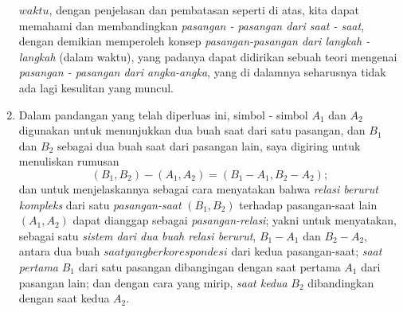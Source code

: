 \documentclass[a4paper, 12pt]{book}
\begin{document}
\begin{enumerate}
$waktu$, dengan penjelasan dan pembatasan seperti di atas, kita dapat memahami
dan membandingkan \textit{pasangan - pasangan dari saat - saat}, dengan 
demikian memperoleh konsep \textit{pasangan-pasangan dari langkah - langkah}
 (dalam waktu), yang padanya dapat didirikan sebuah teori mengenai 
\textit{pasangan - pasangan dari angka-angka}, yang di dalamnya seharusnya 
tidak ada lagi kesulitan yang muncul.  
\item Dalam pandangan yang telah diperluas ini, simbol - simbol $A_1$ dan $A_2$
digunakan untuk menunjukkan dua buah saat dari satu pasangan, dan $B_1$ 
dan $B_2$ sebagai dua buah saat dari pasangan lain, saya digiring untuk 
menuliskan rumusan
\[
(B_1, B_2) - (A_1, A_2) = (B_1 - A_1, B_2 - A_2);
\]
dan untuk menjelaskannya sebagai cara menyatakan bahwa 
\textit{relasi berurut kompleks} dari satu \textit{pasangan-saat} $(B_1, B_2)$
terhadap pasangan-saat lain $(A_1, A_2)$ dapat dianggap sebagai 
\textit{pasangan-relasi}; yakni untuk menyatakan, sebagai satu 
\textit{sistem dari dua buah relasi berurut}, $B_1 - A_1$ dan $B_2 - A_2$, 
antara dua buah $saat yang berkorespondesi$ dari kedua pasangan-saat;
\textit{saat pertama} $B_1$ dari satu pasangan dibangingan dengan saat pertama
$A_1$ dari pasangan lain; dan dengan cara yang mirip, \textit{saat kedua} $B_2$
dibandingkan dengan saat kedua $A_2$.
\end{enumerate}
\end{document}
